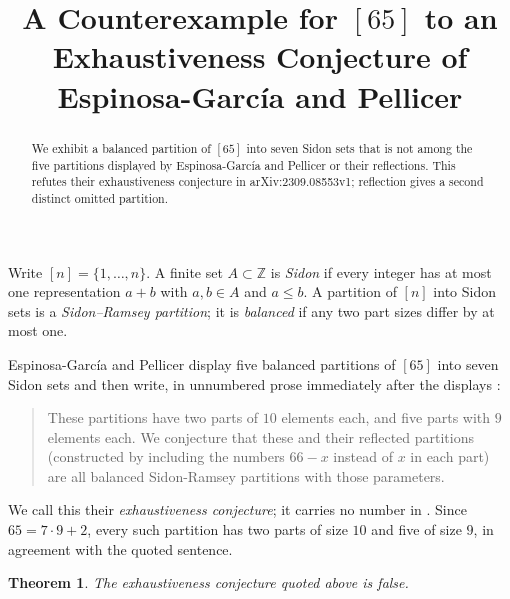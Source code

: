 \documentclass[11pt]{amsart}
\title[A counterexample to an exhaustiveness conjecture]
{A Counterexample for $[65]$ to an Exhaustiveness Conjecture
of Espinosa-Garc\'ia and Pellicer}
\date{}
\newtheorem{theorem}{Theorem}
\begin{document}
\begin{abstract}
We exhibit a balanced partition of $[65]$ into seven Sidon sets that is
not among the five partitions displayed by Espinosa-Garc\'ia and Pellicer
or their reflections. This refutes their exhaustiveness conjecture in
arXiv:2309.08553v1; reflection gives a second distinct omitted partition.
\end{abstract}

\maketitle

Write $[n]=\{1,\ldots,n\}$. A finite set $A\subset\mathbb Z$ is
\emph{Sidon} if every integer has at most one representation $a+b$ with
$a,b\in A$ and $a\le b$. A partition of $[n]$ into Sidon sets is a
\emph{Sidon--Ramsey partition}; it is \emph{balanced} if any two part
sizes differ by at most one.

Espinosa-Garc\'ia and Pellicer display five balanced partitions of
$[65]$ into seven Sidon sets and then write, in unnumbered prose
immediately after the displays \cite[arXiv v1, p.~6]{EGP}:
\begin{quote}
These partitions have two parts of $10$ elements each, and five parts
with $9$ elements each. We conjecture that these and their reflected
partitions (constructed by including the numbers $66-x$ instead of $x$
in each part) are all balanced Sidon-Ramsey partitions with those
parameters.
\end{quote}
We call this their \emph{exhaustiveness conjecture}; it carries no
number in \cite{EGP}. Since $65=7\cdot9+2$, every such partition has two
parts of size $10$ and five of size $9$, in agreement with the quoted
sentence.

\begin{theorem}
The exhaustiveness conjecture quoted above is false.
\end{theorem}
\end{document}
